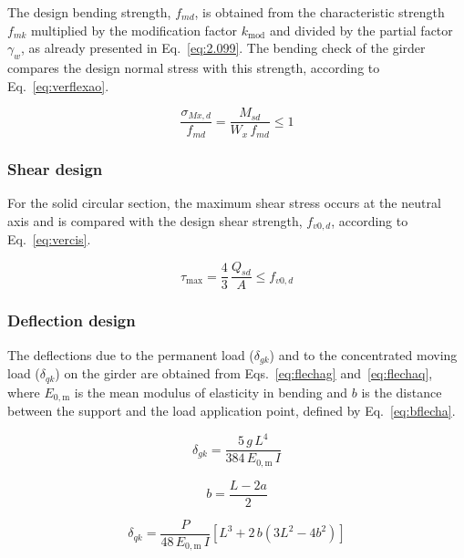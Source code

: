 The design bending strength, $f_{md}$, is obtained from the characteristic strength $f_{mk}$ multiplied by the modification factor $k_{\mathrm{mod}}$ and divided by the partial factor $\gamma_w$, as already presented in Eq.~\eqref{eq:2.099}.
The bending check of the girder compares the design normal stress with this strength, according to Eq.~\eqref{eq:verflexao}.

\begin{equation}
\frac{\sigma_{Mx,d}}{f_{md}} = \frac{M_{sd}}{W_x\,f_{md}} \leq 1
\label{eq:verflexao}
\end{equation}

\subsubsection{Shear design}

For the solid circular section, the maximum shear stress occurs at the neutral axis and is compared with the design shear strength, $f_{v0,d}$, according to Eq.~\eqref{eq:vercis}.

\begin{equation}
\tau_{\max} = \frac{4}{3}\,\frac{Q_{sd}}{A} \leq f_{v0,d}
\label{eq:vercis}
\end{equation}

\subsubsection{Deflection design}

The deflections due to the permanent load ($\delta_{gk}$) and to the concentrated moving load ($\delta_{qk}$) on the girder are obtained from Eqs.~\eqref{eq:flechag} and~\eqref{eq:flechaq}, where $E_{0,\mathrm{m}}$ is the mean modulus of elasticity in bending and $b$ is the distance between the support and the load application point, defined by Eq.~\eqref{eq:bflecha}.

\begin{equation}
\delta_{gk} = \frac{5\,g\,L^4}{384\,E_{0,\mathrm{m}}\,I}
\label{eq:flechag}
\end{equation}

\begin{equation}
b = \frac{L - 2a}{2}
\label{eq:bflecha}
\end{equation}

\begin{equation}
\delta_{qk} = \frac{P}{48\,E_{0,\mathrm{m}}\,I}\left[L^3 + 2\,b\left(3L^2 - 4b^2\right)\right]
\label{eq:flechaq}
\end{equation}

